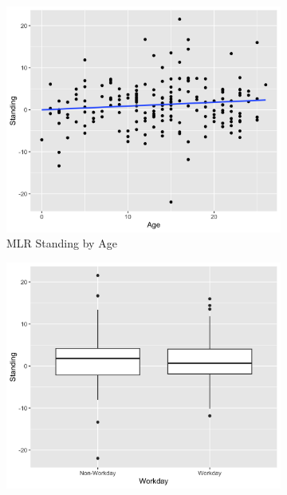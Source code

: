\documentclass[12pt,twoside,letterpaper]{article}
\theoremstyle{definition}
\theoremstyle{definition}
\begin{document}
            \begin{figure} 
                \centering
                \begin{subfigure}[b]{0.32\textwidth}
                \centering
                \includegraphics[width=\textwidth]{pics/mlr stand by age.png}
                \caption[]%
                {{\small MLR Standing by Age}}
                \label{fig: stand v age}
                \end{subfigure}
                \hfill
                \begin{subfigure}[b]{0.32\textwidth}
                \centering
                \includegraphics[width=\textwidth]{pics/mlr stand by day.png}

\end{subfigure}
\end{figure}
\end{document}
